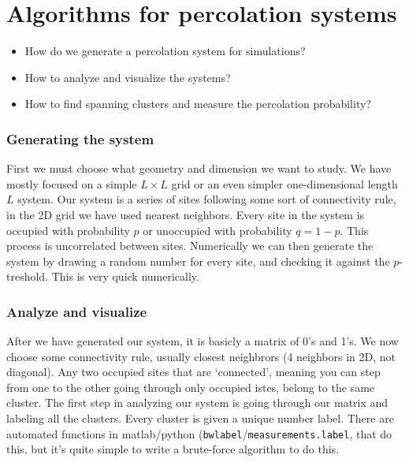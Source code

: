 \documentclass[a4paper, 11pt, notitlepage, english]{article}
\begin{document}


\section{Algorithms for percolation systems}
\begin{itemize}
\item How do we generate a percolation system for simulations? 
\item How to analyze and visualize the systems?
\item How to find spanning clusters and measure the percolation probability?
\end{itemize}

\subsubsection*{Generating the system}

First we must choose what geometry and dimension we want to study. We have mostly focused on a simple $L\times L$ grid or an even simpler one-dimensional length $L$ system. Our system is a series of sites following some sort of connectivity rule, in the 2D grid we have used nearest neighbors. Every site in the system is occupied with probability $p$ or unoccupied with probability $q=1-p$. This process is uncorrelated between sites. Numerically we can then generate the system by drawing a random number for every site, and checking it against the $p$-treshold. This is very quick numerically.

\subsubsection*{Analyze and visualize}

After we have generated our system, it is basicly a matrix of 0's and 1's. We now choose some connectivity rule, usually closest neighbrors (4 neighbors in 2D, not diagonal). Any two occupied sites that are `connected', meaning you can step from one to the other going through only occupied istes, belong to the same cluster. The first step in analyzing our system is going through our matrix and labeling all the clusters. Every cluster is given a unique number label. There are automated functions in matlab/python (\verb+bwlabel+/\verb+measurements.label+, that do this, but it's quite simple to write a brute-force algorithm to do this.
\end{document}
